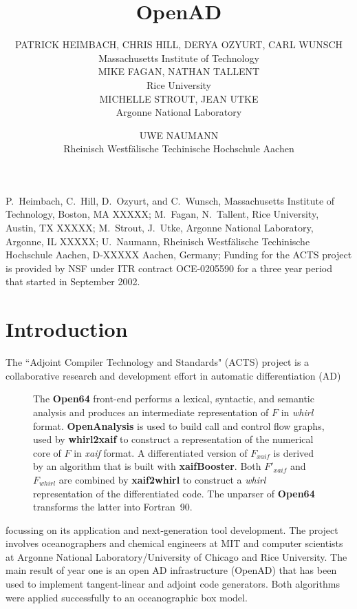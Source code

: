 \documentclass[acmtocl,acmnow]{acmtrans2m}
\title{OpenAD}
\author{PATRICK HEIMBACH, CHRIS HILL, DERYA OZYURT, CARL WUNSCH\\Massachusetts Institute of Technology\\
MIKE FAGAN, NATHAN TALLENT \\Rice University\\
MICHELLE STROUT, JEAN UTKE \\Argonne National Laboratory 
\and
UWE NAUMANN\\Rheinisch Westf\"alische Techinische Hochschule Aachen}
\begin{document}
\begin{bottomstuff} 
P.~Heimbach, C.~Hill, D.~Ozyurt, and C.~Wunsch, Massachusetts Institute of Technology, 
Boston, MA XXXXX;\newline
M.~Fagan, N.~Tallent, Rice University, 
Austin, TX XXXXX;\newline
M.~Strout, J.~Utke, Argonne National Laboratory, 
Argonne, IL XXXXX;\newline
U.~Naumann, Rheinisch Westf\"alische Techinische Hochschule Aachen, 
D-XXXXX Aachen, Germany;\newline
Funding for the ACTS project is provided by NSF under ITR contract OCE-0205590
for a three year period that started in September 2002.
\end{bottomstuff}
\maketitle

\section{Introduction}
The ``Adjoint Compiler Technology and Standards" (ACTS)
project is a collaborative
research and development effort in automatic differentiation (AD)
\begin{figure}
\caption{The {\bf Open64} front-end performs a lexical, syntactic, and semantic analysis and produces an intermediate representation of $F$ in {\em whirl} format.
{\bf OpenAnalysis} is used to build call and control flow graphs, used by
{\bf whirl2xaif} to construct a representation of the numerical core of $F$ in
{\em xaif} format. A differentiated version of $F_{xaif}$ is derived by an 
algorithm that is built with {\bf xaifBooster}. Both  
$F'_{xaif}$ and $F_{whirl}$ are combined by {\bf xaif2whirl} to construct a 
{\em whirl} representation of the differentiated code. The unparser of 
{\bf Open64}
transforms the latter into Fortran~90. 
} \label{fig:overview}
\end{figure}
\cite{BBCG96,CFG+01,CG91,Gri00}
focussing on its application and next-generation tool development.
The project involves
oceanographers and chemical engineers at MIT and computer scientists 
at Argonne National Laboratory/University of Chicago and Rice University.
The main result of year one is an open AD 
infrastructure (OpenAD) that has been used to implement tangent-linear
and adjoint code generators. Both algorithms were applied successfully to an
oceanographic box model. 
\end{document}
